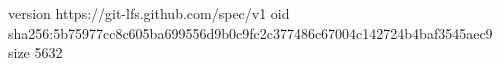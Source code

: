 version https://git-lfs.github.com/spec/v1
oid sha256:5b75977cc8c605ba699556d9b0c9fc2c377486c67004c142724b4baf3545aec9
size 5632
